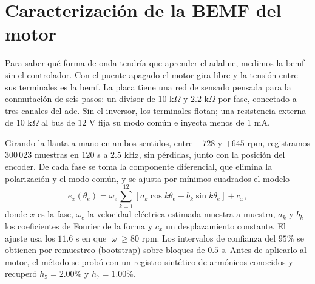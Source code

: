 \documentclass[../../../Tesis_JALS_Maestria.tex]{subfiles}
\begin{document}
\section{Caracterización de la BEMF del motor}
\label{sec:bemf-banco}

Para saber qué forma de onda tendría que aprender el \acrshort{adaline}, medimos la \acrshort{bemf} sin el controlador. Con el puente apagado el motor gira libre y la tensión entre sus terminales es la \acrshort{bemf}. La placa tiene una red de sensado pensada para la conmutación de seis pasos: un divisor de $10$ k$\Omega$ y $2.2$ k$\Omega$ por fase, conectado a tres canales del \acrshort{adc}. Sin el inversor, los terminales flotan; una resistencia externa de $10$ k$\Omega$ al bus de $12$ V fija su modo común e inyecta menos de $1$ mA.

Girando la llanta a mano en ambos sentidos, entre $-728$ y $+645$ rpm, registramos $300\,023$ muestras en $120$ s a $2.5$ kHz, sin pérdidas, junto con la posición del encoder. De cada fase se toma la componente diferencial, que elimina la polarización y el modo común, y se ajusta por mínimos cuadrados el modelo
\begin{equation}
    e_x(\theta_e) = \omega_e \sum_{k=1}^{12} \left[ a_k \cos k\theta_e + b_k \sin k\theta_e \right] + c_x,
    \label{eq:bemf-oc}
\end{equation}
donde $x$ es la fase, $\omega_e$ la velocidad eléctrica estimada muestra a muestra, $a_k$ y $b_k$ los coeficientes de Fourier de la forma y $c_x$ un desplazamiento constante. El ajuste usa los $11.6$ s en que $|\omega| \ge 80$ rpm. Los intervalos de confianza del $95\%$ se obtienen por remuestreo (bootstrap) sobre bloques de $0.5$ s. Antes de aplicarlo al motor, el método se probó con un registro sintético de armónicos conocidos y recuperó $h_5 = 2.00\%$ y $h_7 = 1.00\%$.
\end{document}
